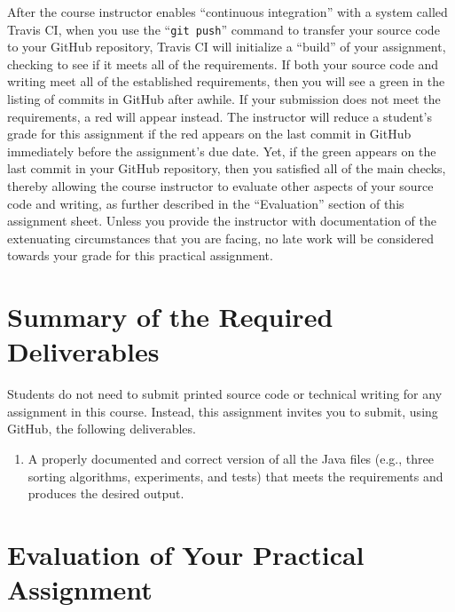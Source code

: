 \documentclass[11pt]{article}
\newcommand{\gitpush}{\command{git push}}
\newcommand{\command}[1]{``\lstinline{#1}''}
\newcommand{\step}[1]{``{#1}''}
\newcommand{\checkmark}{\ding{51}}
\newcommand{\naughtmark}{\ding{55}}
\begin{document}
After the course instructor enables \step{continuous integration} with a system
called Travis CI, when you use the \gitpush{} command to transfer your source
code to your GitHub repository, Travis CI will initialize a \step{build} of your
assignment, checking to see if it meets all of the requirements. If both your
source code and writing meet all of the established requirements, then you will
see a green \checkmark{} in the listing of commits in GitHub after awhile. If
your submission does not meet the requirements, a red \naughtmark{} will appear
instead. The instructor will reduce a student's grade for this assignment if the
red \naughtmark{} appears on the last commit in GitHub immediately before the
assignment's due date. Yet, if the green \checkmark{} appears on the last commit
in your GitHub repository, then you satisfied all of the main checks, thereby
allowing the course instructor to evaluate other aspects of your source code and
writing, as further described in the \step{Evaluation} section of this
assignment sheet. Unless you provide the instructor with documentation of the
extenuating circumstances that you are facing, no late work will be considered
towards your grade for this practical assignment.

\section*{Summary of the Required Deliverables}

\noindent Students do not need to submit printed source code or technical
writing for any assignment in this course. Instead, this assignment invites you
to submit, using GitHub, the following deliverables.

\begin{enumerate}

  \setlength{\itemsep}{0in}

\item A properly documented and correct version of all the Java files (e.g.,
  three sorting algorithms, experiments, and tests) that meets the requirements
  and produces the desired output.

\end{enumerate}

\section*{Evaluation of Your Practical Assignment}
\end{document}
